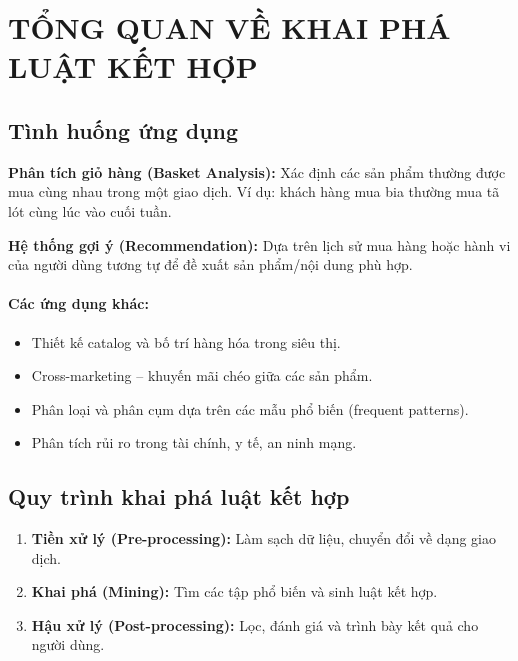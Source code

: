 \documentclass[10pt]{article}
\begin{document}
\onehalfspacing
\renewcommand{\arraystretch}{1.5}

\newcommand{\ChapterNum}{6}
\newcommand{\ChapterTitle}{LUẬT KẾT HỢP VÀ THUẬT TOÁN APRIORI}


\section{TỔNG QUAN VỀ KHAI PHÁ LUẬT KẾT HỢP}

\subsection{Tình huống ứng dụng}

\textbf{Phân tích giỏ hàng (Basket Analysis):} Xác định các sản phẩm thường được mua cùng nhau trong một giao dịch. Ví dụ: khách hàng mua bia thường mua tã lót cùng lúc vào cuối tuần.

\textbf{Hệ thống gợi ý (Recommendation):} Dựa trên lịch sử mua hàng hoặc hành vi của người dùng tương tự để đề xuất sản phẩm/nội dung phù hợp.

\paragraph{Các ứng dụng khác:}
\begin{itemize}
    \item Thiết kế catalog và bố trí hàng hóa trong siêu thị.
    \item Cross-marketing -- khuyến mãi chéo giữa các sản phẩm.
    \item Phân loại và phân cụm dựa trên các mẫu phổ biến (frequent patterns).
    \item Phân tích rủi ro trong tài chính, y tế, an ninh mạng.
\end{itemize}

\subsection{Quy trình khai phá luật kết hợp}

\begin{enumerate}
    \item \textbf{Tiền xử lý (Pre-processing):} Làm sạch dữ liệu, chuyển đổi về dạng giao dịch.
    \item \textbf{Khai phá (Mining):} Tìm các tập phổ biến và sinh luật kết hợp.
    \item \textbf{Hậu xử lý (Post-processing):} Lọc, đánh giá và trình bày kết quả cho người dùng.
\end{enumerate}
\end{document}
